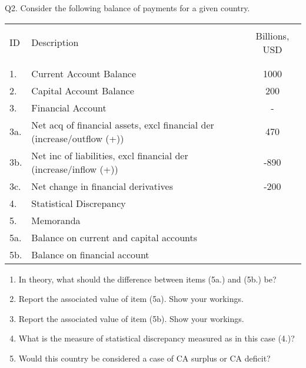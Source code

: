 \documentclass[12pt]{article}
\begin{document}
\newpage

\noindent Q2. Consider the following balance of payments for a given country.

\begin{table}[!h]
	\centering
	\begin{tabular}[t]{l l c }
		\hline
		&&\\
		ID & Description & Billions, USD \\
		&&\\
		\hline
		&&\\
		1. & Current Account Balance & 1000\\
		2. & Capital Account Balance & 200\\
		3. & Financial Account	& -\\
		3a. & Net acq of financial assets, excl financial der (increase/outflow (+))& 470\\
		3b. & Net inc of liabilities, excl financial der (increase/inflow (+))	& -890 \\
		3c. & Net change in financial derivatives & -200\\
		4. & Statistical Discrepancy & \\
		5. & Memoranda & \\
		5a. & Balance on current and capital accounts & \\
		5b. & Balance on financial account & \\
		\hline
	\end{tabular}
\end{table}




\begin{enumerate}[1)]
	\item In theory, what should the difference between items (5a.) and (5b.) be?
	
	\vspace{2.5in}
	
	\item Report the associated value of item (5a). Show your workings.
	
	\vspace{1in}
	
	
	\newpage
	
	\item Report the associated value of item (5b). Show your workings.
	
	\vspace{2in}
	
	\item What is the measure of statistical discrepancy measured as in this case (4.)?
	
	\vspace{2.5in}
	
	\item Would this country be considered a case of CA surplus or CA deficit?
	
	\vspace{2.5in}
	
\end{enumerate}
\end{document}
